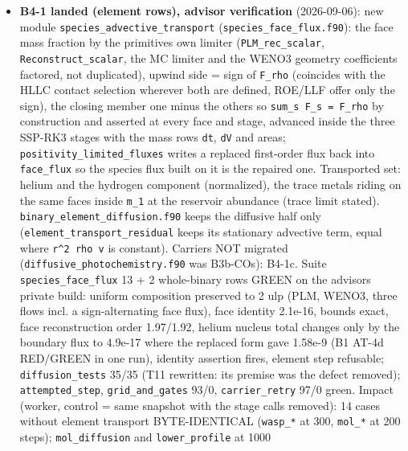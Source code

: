 \documentclass[english,a4paper]{my_memo}
\begin{document}
\begin{itemize}
  elements far from the reservoir ratio, and a uniform composition is what both
  forms carry exactly; a converged pair is what would measure the difference at
  the separation those cases reach, and is named as open in
  \texttt{docs/b4\_spatial\_operator\_design\_20260906.md}. No golden was refreshed.
\item
  \textbf{B4-1 landed (element rows), advisor verification} (2026-09-06): new
  module \texttt{species\_advective\_transport} (\texttt{species\_face\_flux.f90}): the face
  mass fraction by the primitives\textquotesingle{} own limiter (\texttt{PLM\_rec\_scalar},
  \texttt{Reconstruct\_scalar}, the MC limiter and the WENO3 geometry coefficients
  factored, not duplicated), upwind side = sign of \texttt{F\_rho} (coincides with
  the HLLC contact selection wherever both are defined, ROE/LLF offer only
  the sign), the closing member one minus the others so
  \texttt{sum\_s\ F\_s\ =\ F\_rho} by construction and asserted at every face and stage,
  advanced inside the three SSP-RK3 stages with the mass row\textquotesingle s \texttt{dt}, \texttt{dV}
  and areas; \texttt{positivity\_limited\_fluxes} writes a replaced first-order flux
  back into \texttt{face\_flux} so the species flux built on it is the repaired one.
  Transported set: helium and the hydrogen component (normalized), the trace
  metals riding on the same faces inside \texttt{m\_1} at the reservoir abundance
  (trace limit stated). \texttt{binary\_element\_diffusion.f90} keeps the diffusive
  half only (\texttt{element\_transport\_residual} keeps its stationary advective
  term, equal where \texttt{r\^{}2\ rho\ v} is constant). Carriers NOT migrated
  (\texttt{diffusive\_photochemistry.f90} was B3b-CO\textquotesingle s): B4-1c. Suite
  \texttt{species\_face\_flux} 13 + 2 whole-binary rows GREEN on the advisor\textquotesingle s private
  build: uniform composition preserved to 2 ulp (PLM, WENO3, three flows
  incl. a sign-alternating face flux), face identity 2.1e-16, bounds exact,
  face reconstruction order 1.97/1.92, helium nucleus total changes only by
  the boundary flux to 4.9e-17 where the replaced form gave 1.58e-9 (B1
  AT-4d RED/GREEN in one run), identity assertion fires, element step
  refusable; \texttt{diffusion\_tests} 35/35 (T11 rewritten: its premise was the
  defect removed); \texttt{attempted\_step}, \texttt{grid\_and\_gates} 93/0, \texttt{carrier\_retry}
  97/0 green. Impact (worker, control = same snapshot with the stage calls
  removed): 14 cases without element transport BYTE-IDENTICAL (\texttt{wasp\_*} at
  300, \texttt{mol\_*} at 200 steps); \texttt{mol\_diffusion} and \texttt{lower\_profile} at 1000

\end{itemize}
\end{document}

